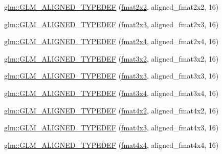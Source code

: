 \begin{DoxyCompactItemize}
\item 
\hyperlink{group__gtx__type__aligned_ga6fa2df037dbfc5fe8c8e0b4db8a34953}{glm\+::\+G\+L\+M\+\_\+\+A\+L\+I\+G\+N\+E\+D\+\_\+\+T\+Y\+P\+E\+D\+EF} (\hyperlink{group__gtc__type__precision_gad3b3ab6399b8b960e8994b37521bab86}{fmat2x2}, aligned\+\_\+fmat2x2, 16)
\item 
\hyperlink{group__gtx__type__aligned_ga0743b4f4f69a3227b82ff58f6abbad62}{glm\+::\+G\+L\+M\+\_\+\+A\+L\+I\+G\+N\+E\+D\+\_\+\+T\+Y\+P\+E\+D\+EF} (\hyperlink{group__gtc__type__precision_ga872da486765a299d84e9e8e6232ed306}{fmat2x3}, aligned\+\_\+fmat2x3, 16)
\item 
\hyperlink{group__gtx__type__aligned_ga1a76b325fdf70f961d835edd182c63dd}{glm\+::\+G\+L\+M\+\_\+\+A\+L\+I\+G\+N\+E\+D\+\_\+\+T\+Y\+P\+E\+D\+EF} (\hyperlink{group__gtc__type__precision_gabaf7537f5284456254b1da1cd6fd2b78}{fmat2x4}, aligned\+\_\+fmat2x4, 16)
\item 
\hyperlink{group__gtx__type__aligned_ga4b4e181cd041ba28c3163e7b8074aef0}{glm\+::\+G\+L\+M\+\_\+\+A\+L\+I\+G\+N\+E\+D\+\_\+\+T\+Y\+P\+E\+D\+EF} (\hyperlink{group__gtc__type__precision_gaed9c8fe9d2e094bf3bc7c606bbae1a6b}{fmat3x2}, aligned\+\_\+fmat3x2, 16)
\item 
\hyperlink{group__gtx__type__aligned_ga27b13f465abc8a40705698145e222c3f}{glm\+::\+G\+L\+M\+\_\+\+A\+L\+I\+G\+N\+E\+D\+\_\+\+T\+Y\+P\+E\+D\+EF} (\hyperlink{group__gtc__type__precision_ga5bf6f06e3cac1ed82489f858a0816aaa}{fmat3x3}, aligned\+\_\+fmat3x3, 16)
\item 
\hyperlink{group__gtx__type__aligned_ga2608d19cc275830a6f8c0b6405625a4f}{glm\+::\+G\+L\+M\+\_\+\+A\+L\+I\+G\+N\+E\+D\+\_\+\+T\+Y\+P\+E\+D\+EF} (\hyperlink{group__gtc__type__precision_gab2daf8468a8b9343c065816df07e29fe}{fmat3x4}, aligned\+\_\+fmat3x4, 16)
\item 
\hyperlink{group__gtx__type__aligned_ga93f09768241358a287c4cca538f1f7e7}{glm\+::\+G\+L\+M\+\_\+\+A\+L\+I\+G\+N\+E\+D\+\_\+\+T\+Y\+P\+E\+D\+EF} (\hyperlink{group__gtc__type__precision_ga279cf309f0098c3d26ce88fe8a26375a}{fmat4x2}, aligned\+\_\+fmat4x2, 16)
\item 
\hyperlink{group__gtx__type__aligned_ga7c117e3ecca089e10247b1d41d88aff9}{glm\+::\+G\+L\+M\+\_\+\+A\+L\+I\+G\+N\+E\+D\+\_\+\+T\+Y\+P\+E\+D\+EF} (\hyperlink{group__gtc__type__precision_ga0ab797a258612fe48345951a0bdd6b8c}{fmat4x3}, aligned\+\_\+fmat4x3, 16)
\item 
\hyperlink{group__gtx__type__aligned_ga07c75cd04ba42dc37fa3e105f89455c5}{glm\+::\+G\+L\+M\+\_\+\+A\+L\+I\+G\+N\+E\+D\+\_\+\+T\+Y\+P\+E\+D\+EF} (\hyperlink{group__gtc__type__precision_gaeda4baa9a8e3113ff879dd5e7bdf5334}{fmat4x4}, aligned\+\_\+fmat4x4, 16)

\end{DoxyCompactItemize}
